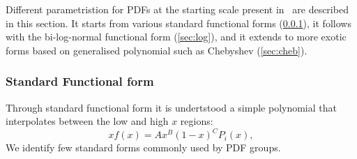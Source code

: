
\label{sec:pdfparam}
Different parametristion for PDFs at the starting scale present in \fitter\ are described in this section.
It starts from various standard functional forms (\ref{sec:stdform}), it follows with the bi-log-normal functional form (\ref{sec:log}), and it extends to more exotic forms based on generalised polynomial such as Chebyshev (\ref{sec:cheb}).

\subsubsection{Standard Functional form}
\label{sec:stdform}
Through standard functional form it is undertstood a simple polynomial 
that interpolates between the low and high $x$ regions:
\begin{equation}
 xf(x) = A x^{B} (1-x)^{C} P_i(x),
\label{eqn:pdf_std}
\end{equation}
We identify few standard forms commonly used by PDF groups.

